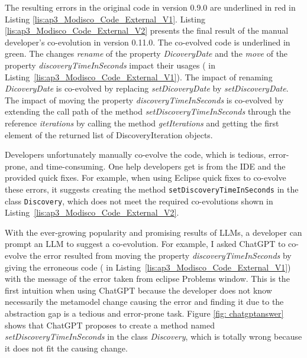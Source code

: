 The resulting errors in the original code in version 0.9.0 are underlined in red in Listing \ref{lis:ap3_Modisco_Code_External_V1}. Listing \ref{lis:ap3_Modisco_Code_External_V2} presents the final result of the manual developer's co-evolution in version 0.11.0. The co-evolved code is underlined in green. 
The changes \textit{rename} of the property \textit{ DicoveryDate} and the \textit{move} of the property \emph{discoveryTimeInSeconds} impact their usages ({\small{}} in Listing~\ref{lis:ap3_Modisco_Code_External_V1}). The impact of renaming \textit{ DicoveryDate} is co-evolved by replacing \textit{setDicoveryDate} by \textit{setDiscoveryDate}. The impact of moving the property \emph{discoveryTimeInSeconds} is co-evolved by extending the call path of the method \emph{setDiscoveryTimeInSeconds} through the reference \textit{iterations} by calling the method \textit{getIterations} and getting the first element of the returned list of DiscoveryIteration objects.

Developers unfortunately manually co-evolve the code, which is tedious, error-prone, and time-consuming. 
One help developers get is from the IDE and the provided quick fixes. For example, when using Eclipse quick fixes to co-evolve these errors, it suggests creating the method \texttt{setDiscoveryTimeInSeconds} in the class \texttt{Discovery}, which does not meet the required co-evolutions shown in Listing~\ref{lis:ap3_Modisco_Code_External_V2}.

With the ever-growing popularity and promising results of LLMs, a developer can prompt an LLM to suggest a co-evolution. 
For example, 
I asked ChatGPT to co-evolve the error resulted from moving the property \emph{discoveryTimeInSeconds} by giving the erroneous code ({\small{}} in Listing~\ref{lis:ap3_Modisco_Code_External_V1})  with the message of the error taken from eclipse Problems window. This is the first intuition when using ChatGPT because the developer does not know necessarily the metamodel change causing the error and finding it due to the abstraction gap is a tedious and error-prone task. Figure \ref{fig: chatgptanswer} shows that ChatGPT proposes to create a method named \emph{setDiscoveryTimeInSeconds} in the class \emph{Discovery}, which is totally wrong because it does not fit the causing change. 

